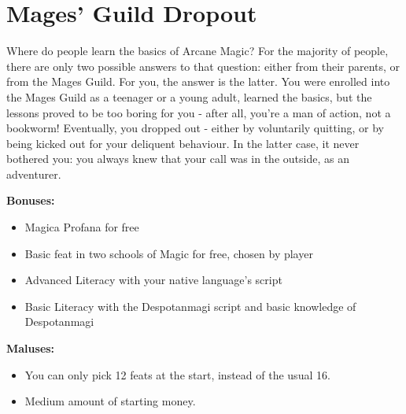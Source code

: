 \section{Mages' Guild Dropout}
Where do people learn the basics of Arcane Magic? For the majority of people, there are only two possible answers to that question: either from their parents, or from the Mages Guild. For you, the answer is the latter. You were enrolled into the Mages Guild as a teenager or a young adult, learned the basics, but the lessons proved to be too boring for you - after all, you're a man of action, not a bookworm! Eventually, you dropped out - either by voluntarily quitting, or by being kicked out for your deliquent behaviour. In the latter case, it never bothered you: you always knew that your call was in the outside, as an adventurer. 


\textbf{Bonuses:}
\begin{itemize}
	\item Magica Profana for free
	\item Basic feat in two schools of Magic for free, chosen by player
	\item Advanced Literacy with your native language's script
	\item Basic Literacy with the Despotanmagi script and basic knowledge of Despotanmagi 
\end{itemize}


\textbf{Maluses:}
\begin{itemize}
	\item You can only pick 12 feats at the start, instead of the usual 16.
	\item Medium amount of starting money.
\end{itemize}
